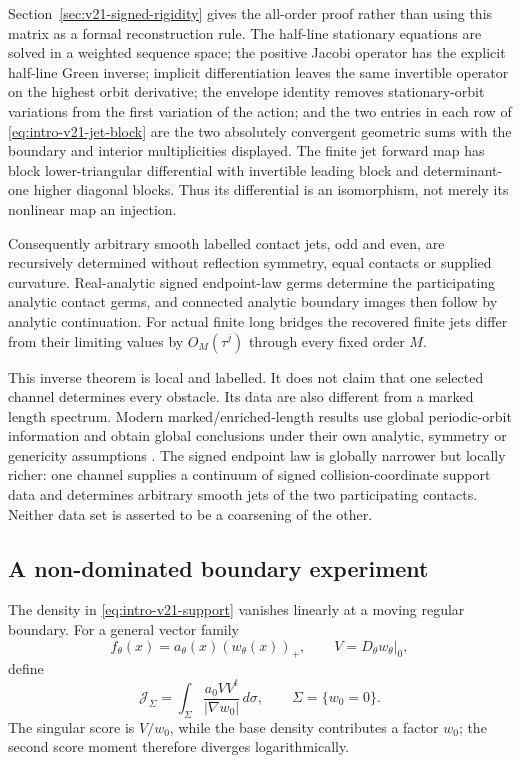 Section~\ref{sec:v21-signed-rigidity} gives the all-order proof rather than
using this matrix as a formal reconstruction rule.  The half-line stationary
equations are solved in a weighted sequence space; the positive Jacobi
operator has the explicit half-line Green inverse; implicit differentiation
leaves the same invertible operator on the highest orbit derivative; the
envelope identity removes stationary-orbit variations from the first
variation of the action; and the two entries in each row of
\eqref{eq:intro-v21-jet-block} are the two absolutely convergent geometric
sums with the boundary and interior multiplicities displayed.  The finite
jet forward map has block lower-triangular differential with invertible
leading block and determinant-one higher diagonal blocks.  Thus its
differential is an isomorphism, not merely its nonlinear map an injection.

Consequently arbitrary smooth labelled contact jets, odd and even, are
recursively determined without reflection symmetry, equal contacts or
supplied curvature.  Real-analytic signed endpoint-law germs determine the
participating analytic contact germs, and connected analytic boundary images
then follow by analytic continuation.  For actual finite long bridges the
recovered finite jets differ from their limiting values by
$O_M(\tau^j)$ through every fixed order $M$.

This inverse theorem is local and labelled.  It does not claim that one
selected channel determines every obstacle.  Its data are also different
from a marked length spectrum.  Modern marked/enriched-length results use
global periodic-orbit information and obtain global conclusions under their
own analytic, symmetry or genericity assumptions
\cite{BDKL,DSKL,Osterman,FinamoreLeguil}.  The signed endpoint law is globally
narrower but locally richer: one channel supplies a continuum of signed
collision-coordinate support data and determines arbitrary smooth jets of
the two participating contacts.  Neither data set is asserted to be a
coarsening of the other.

\subsection{A non-dominated boundary experiment}

The density in \eqref{eq:intro-v21-support} vanishes linearly at a moving
regular boundary.  For a general vector family
\[
 f_\theta(x)=a_\theta(x)(w_\theta(x))_+,
 \qquad
 V=D_\theta w_\theta|_0,
\]
define
\begin{equation}\label{eq:intro-v21-information}
 \mathcal J_\Sigma=
 \int_{\Sigma}\frac{a_0VV^t}{|\nabla w_0|}\,d\sigma,
 \qquad \Sigma=\{w_0=0\}.
\end{equation}
The singular score is $V/w_0$, while the base density contributes a factor
$w_0$; the second score moment therefore diverges logarithmically.

